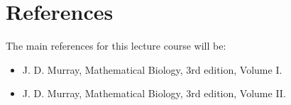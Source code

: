 \section{References}
The main references for this lecture course will be:
\begin{itemize}
\item J. D. Murray, Mathematical Biology, 3rd edition, Volume I.
\item J. D. Murray, Mathematical Biology, 3rd edition, Volume II.
\end{itemize}
\begin{figure}[!!!h!!!tb]
\centering
{}

\end{figure}
